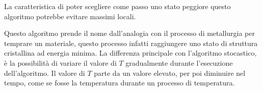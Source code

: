 \documentclass{article}
\numberwithin{equation}{subsection}
\begin{document}
La caratteristica di poter scegliere come passo uno stato peggiore questo algoritmo potrebbe evitare massimi locali. 


Questo algoritmo prende il nome dall'analogia con il processo di metallurgia per temprare un materiale, questo processo infatti raggiungere uno stato di struttura 
cristallina ad energia minima. La differenza principale con l'algoritmo stocastico, è la possibilità di variare il valore di $T$ gradualmente durante l'esecuzione 
dell'algoritmo. Il valore di $T$ parte da un valore elevato, per poi diminuire nel tempo, come se fosse la temperatura durante un processo di temperatura. 


\end{document}
